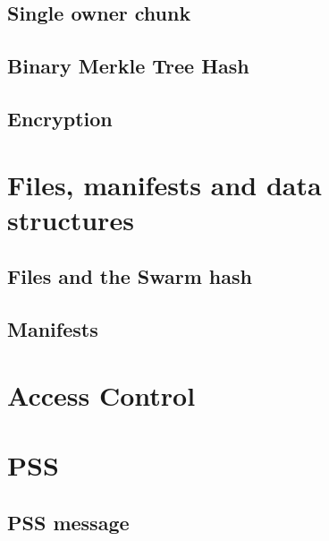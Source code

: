 \subsection{Single owner chunk \statusgreen}\label{spec:format:soc}

\subsection{Binary Merkle Tree Hash \statusyellow}\label{spec:format:bmt}

\subsection{Encryption \statusyellow}\label{spec:format:encryption}


\section{Files, manifests and data structures\statusyellow}\label{spec:format:data-structures}
\subsection{Files and the Swarm hash \statusyellow}\label{spec:format:files}

\subsection{Manifests \statusyellow}\label{spec:format:manifests}

%


\section{Access Control \statusgreen}\label{spec:format:access-control}


\section{PSS \statusyellow}

\subsection{PSS message\statusgreen}
\label{spec:format:pss-messsage}

